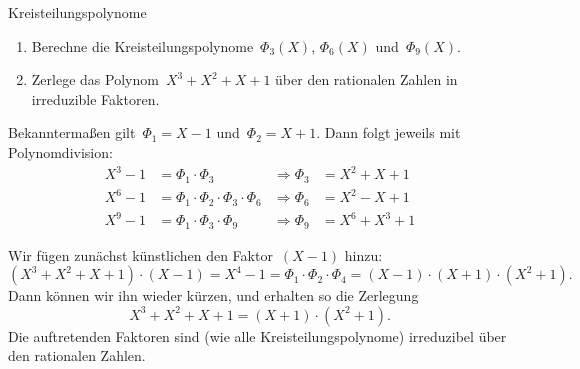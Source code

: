 \documentclass{algblatt}
\begin{document}
\begin{aufgabe}{Kreisteilungspolynome}
\begin{enumerate}
\item Berechne die Kreisteilungspolynome~$\Phi_3(X)$, $\Phi_6(X)$
und~$\Phi_9(X)$.

\item Zerlege das Polynom~$X^3 + X^2 + X + 1$ über den rationalen Zahlen
in irreduzible Faktoren.
\end{enumerate}

\begin{loesungE}
\item Bekanntermaßen gilt~$\Phi_1 = X - 1$ und~$\Phi_2 = X + 1$. Dann folgt
jeweils mit Polynomdivision:
\begin{align*}
  X^3 - 1 &= \Phi_1 \cdot \Phi_3
    & \Longrightarrow \Phi_3 &= X^2 + X + 1 \\
  X^6 - 1 &= \Phi_1 \cdot \Phi_2 \cdot \Phi_3 \cdot \Phi_6
    & \Longrightarrow \Phi_6 &= X^2 - X + 1 \\
  X^9 - 1 &= \Phi_1 \cdot \Phi_3 \cdot \Phi_9
    & \Longrightarrow \Phi_9 &= X^6 + X^3 + 1
\end{align*}

\item Wir fügen zunächst künstlichen den Faktor~$(X-1)$ hinzu:
\[ (X^3 + X^2 + X + 1) \cdot (X-1) =
  X^4 - 1 = \Phi_1 \cdot \Phi_2 \cdot \Phi_4 =
  (X-1) \cdot (X+1) \cdot (X^2+1). \]
Dann können wir ihn wieder kürzen, und erhalten so die Zerlegung
\[ X^3 + X^2 + X + 1 = (X+1) \cdot (X^2 + 1). \]
Die auftretenden Faktoren sind (wie alle Kreisteilungspolynome) irreduzibel
über den rationalen Zahlen.
\end{loesungE}
\end{aufgabe}
\end{document}
